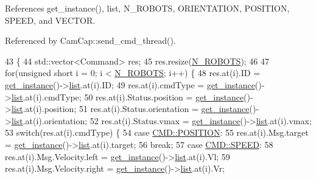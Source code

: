 References get\+\_\+instance(), list, N\+\_\+\+R\+O\+B\+O\+TS, O\+R\+I\+E\+N\+T\+A\+T\+I\+ON, P\+O\+S\+I\+T\+I\+ON, S\+P\+E\+ED, and V\+E\+C\+T\+OR.



Referenced by Cam\+Cap\+::send\+\_\+cmd\+\_\+thread().


\begin{DoxyCode}
43                                               \{
44     std::vector<Command> res;
45     res.resize(\hyperlink{robots_8hpp_a11f808c4481e347f5ea9a10237470606}{N\_ROBOTS});
46 
47     \textcolor{keywordflow}{for}(\textcolor{keywordtype}{unsigned} \textcolor{keywordtype}{short} i = 0; i < \hyperlink{robots_8hpp_a11f808c4481e347f5ea9a10237470606}{N\_ROBOTS}; i++) \{
48         res.at(i).ID = \hyperlink{class_robots_a589bce74db5f34af384952d48435168f}{get\_instance}()->\hyperlink{class_robots_a2c6b77265028f82a4342ca1ef15ed305}{list}.at(i).ID;
49         res.at(i).cmdType = \hyperlink{class_robots_a589bce74db5f34af384952d48435168f}{get\_instance}()->\hyperlink{class_robots_a2c6b77265028f82a4342ca1ef15ed305}{list}.at(i).cmdType;
50         res.at(i).Status.position = \hyperlink{class_robots_a589bce74db5f34af384952d48435168f}{get\_instance}()->\hyperlink{class_robots_a2c6b77265028f82a4342ca1ef15ed305}{list}.at(i).position;
51         res.at(i).Status.orientation = \hyperlink{class_robots_a589bce74db5f34af384952d48435168f}{get\_instance}()->\hyperlink{class_robots_a2c6b77265028f82a4342ca1ef15ed305}{list}.at(i).orientation;
52         res.at(i).Status.vmax = \hyperlink{class_robots_a589bce74db5f34af384952d48435168f}{get\_instance}()->\hyperlink{class_robots_a2c6b77265028f82a4342ca1ef15ed305}{list}.at(i).vmax;
53         \textcolor{keywordflow}{switch}(res.at(i).cmdType) \{
54             \textcolor{keywordflow}{case} \hyperlink{serial_w_8hpp_a440f0e10bb28b153f5661c934bc6b89f}{CMD::POSITION}:
55                 res.at(i).Msg.target = \hyperlink{class_robots_a589bce74db5f34af384952d48435168f}{get\_instance}()->\hyperlink{class_robots_a2c6b77265028f82a4342ca1ef15ed305}{list}.at(i).target;
56                 \textcolor{keywordflow}{break};
57             \textcolor{keywordflow}{case} \hyperlink{serial_w_8hpp_aac3553b3932cbfeeac4526ce7ca0336b}{CMD::SPEED}:
58                 res.at(i).Msg.Velocity.left = \hyperlink{class_robots_a589bce74db5f34af384952d48435168f}{get\_instance}()->\hyperlink{class_robots_a2c6b77265028f82a4342ca1ef15ed305}{list}.at(i).Vl;
59                 res.at(i).Msg.Velocity.right = \hyperlink{class_robots_a589bce74db5f34af384952d48435168f}{get\_instance}()->\hyperlink{class_robots_a2c6b77265028f82a4342ca1ef15ed305}{list}.at(i).Vr;

\end{DoxyCode}
